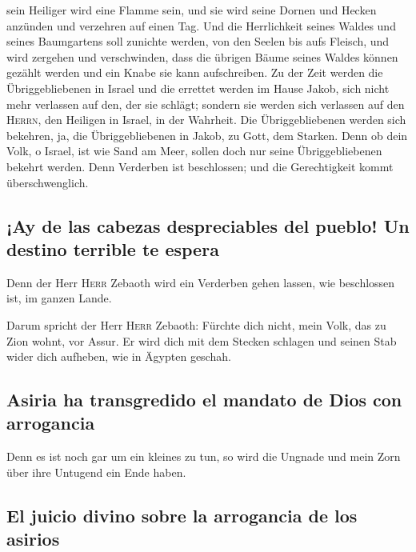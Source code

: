sein Heiliger wird eine Flamme sein, und sie wird seine Dornen und
Hecken anzünden und verzehren auf einen Tag.  Und die
Herrlichkeit seines Waldes und seines Baumgartens soll zunichte werden,
von den Seelen bis aufs Fleisch, und wird zergehen und verschwinden,
 dass die übrigen Bäume seines Waldes können gezählt
werden und ein Knabe sie kann aufschreiben.  Zu der Zeit
werden die Übriggebliebenen in Israel und die errettet werden im Hause
Jakob, sich nicht mehr verlassen auf den, der sie schlägt; sondern sie
werden sich verlassen auf den \textsc{Herrn}, den Heiligen in Israel, in
der Wahrheit.  Die Übriggebliebenen werden sich bekehren,
ja, die Übriggebliebenen in Jakob, zu Gott, dem Starken. 
Denn ob dein Volk, o Israel, ist wie Sand am Meer, sollen doch nur seine
Übriggebliebenen bekehrt werden. Denn Verderben ist beschlossen; und die
Gerechtigkeit kommt überschwenglich.

\hypertarget{ay-de-las-cabezas-despreciables-del-pueblo-un-destino-terrible-te-espera}{%
\subsection{¡Ay de las cabezas despreciables del pueblo! Un destino
terrible te
espera}\label{ay-de-las-cabezas-despreciables-del-pueblo-un-destino-terrible-te-espera}}

 Denn der Herr \textsc{Herr} Zebaoth wird ein Verderben
gehen lassen, wie beschlossen ist, im ganzen Lande.

 Darum spricht der Herr \textsc{Herr} Zebaoth: Fürchte
dich nicht, mein Volk, das zu Zion wohnt, vor Assur. Er wird dich mit
dem Stecken schlagen und seinen Stab wider dich aufheben, wie in Ägypten
geschah.

\hypertarget{asiria-ha-transgredido-el-mandato-de-dios-con-arrogancia}{%
\subsection{Asiria ha transgredido el mandato de Dios con
arrogancia}\label{asiria-ha-transgredido-el-mandato-de-dios-con-arrogancia}}

 Denn es ist noch gar um ein kleines zu tun, so wird die
Ungnade und mein Zorn über ihre Untugend ein Ende haben.

\hypertarget{el-juicio-divino-sobre-la-arrogancia-de-los-asirios}{%
\subsection{El juicio divino sobre la arrogancia de los
asirios}\label{el-juicio-divino-sobre-la-arrogancia-de-los-asirios}}

